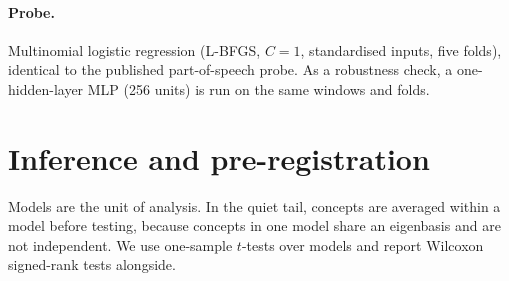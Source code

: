 \documentclass[11pt]{report}
\begin{document}
\paragraph{Probe.} Multinomial logistic regression (L-BFGS, $C=1$, standardised
inputs, five folds), identical to the published part-of-speech probe. As a
robustness check, a one-hidden-layer MLP (256 units) is run on the same windows
and folds.

\section{Inference and pre-registration}\label{sec:prereg}
Models are the unit of analysis. In the quiet tail, concepts are averaged within
a model before testing, because concepts in one model share an eigenbasis and are
not independent. We use one-sample $t$-tests over models and report Wilcoxon
signed-rank tests alongside.
\end{document}

